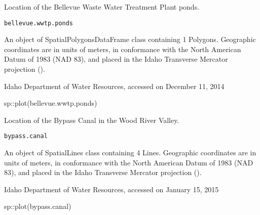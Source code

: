 \documentclass[a4paper]{book}
\begin{document}
%
\begin{Description}\relax
Location of the Bellevue Waste Water Treatment Plant ponds.
\end{Description}
%
\begin{Usage}
\begin{verbatim}
bellevue.wwtp.ponds
\end{verbatim}
\end{Usage}
%
\begin{Format}
An object of SpatialPolygonsDataFrame class containing 1 Polygons.
Geographic coordinates are in units of meters, in conformance with the
North American Datum of 1983 (NAD 83), and placed in the
Idaho Transverse Mercator projection ().
\end{Format}
%
\begin{Source}\relax
Idaho Department of Water Resources, accessed on December 11, 2014
\end{Source}
%
\begin{Examples}
\begin{ExampleCode}
sp::plot(bellevue.wwtp.ponds)

\end{ExampleCode}
\end{Examples}
%
\begin{Description}\relax
Location of the Bypass Canal in the Wood River Valley.
\end{Description}
%
\begin{Usage}
\begin{verbatim}
bypass.canal
\end{verbatim}
\end{Usage}
%
\begin{Format}
An object of SpatialLines class containing 4 Lines.
Geographic coordinates are in units of meters, in conformance with the
North American Datum of 1983 (NAD 83), and placed in the
Idaho Transverse Mercator projection ().
\end{Format}
%
\begin{Source}\relax
Idaho Department of Water Resources, accessed on January 15, 2015
\end{Source}
%
\begin{Examples}
\begin{ExampleCode}
sp::plot(bypass.canal)

\end{ExampleCode}
\end{Examples}
\end{document}
